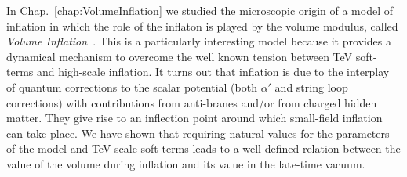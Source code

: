 \documentclass[12pt,a4paper]{book}
\begin{document}

In Chap.~\ref{chap:VolumeInflation} we studied the microscopic origin of a model of inflation in which the role of the inflaton is played by the volume modulus, called \textit{Volume Inflation}~\cite{Cicoli:2015wja}. This is a particularly interesting model because it provides a dynamical mechanism to overcome the well known tension between TeV soft-terms and high-scale inflation. It turns out that inflation is due to the interplay of quantum corrections to the scalar potential (both $\alpha'$ and string loop corrections) with contributions from anti-branes and/or from charged hidden matter. They give rise to an inflection point around which small-field inflation can take place. We have shown that requiring natural values for the parameters of the model and TeV scale soft-terms leads to a well defined relation between the value of the volume during inflation and its value in the late-time vacuum.\\

\end{document}
